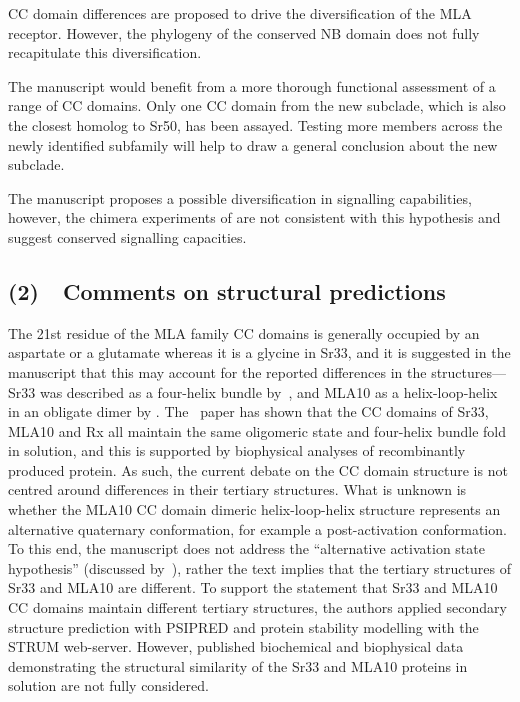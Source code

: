 \documentclass[10pt]{article}
\let\cite\citep
\providecommand\citep{\cite}
\begin{document}
\par\null

CC domain differences are proposed to drive the diversification of the
MLA receptor. However, the phylogeny of the conserved NB domain does not
fully recapitulate this diversification.

\par\null

The manuscript would benefit from a more thorough functional assessment
of a range of CC domains. Only one CC domain from the new subclade,
which is also the closest homolog to Sr50, has been assayed. Testing
more members across the newly identified subfamily will help to draw a
general conclusion about the new subclade.

\par\null

The manuscript proposes a possible diversification in signalling
capabilities, however, the chimera experiments of \cite{Jordan2011} are
not consistent with this hypothesis and suggest conserved signalling
capacities.

\par\null

\subsection*{(2)~~Comments on structural
predictions}

{\label{390222}}

The 21st residue of the MLA family CC domains is generally occupied by
an aspartate or a glutamate whereas it is a glycine in Sr33, and it is
suggested in the manuscript that this may account for the reported
differences in the structures---Sr33 was described as a four-helix
bundle by~\cite{Casey2016}, and MLA10 as a helix-loop-helix in an
obligate dimer by \cite{Maekawa2011}. The~\cite{Casey2016} paper has
shown that the CC domains of Sr33, MLA10 and Rx all maintain the same
oligomeric state and four-helix bundle fold in solution, and this is
supported by biophysical analyses of recombinantly produced protein. As
such, the current debate on the CC domain structure is not centred
around differences in their tertiary structures. What is unknown is
whether the MLA10 CC domain dimeric helix-loop-helix structure
represents an alternative quaternary conformation, for example a
post-activation conformation. To this end, the manuscript does not
address the ``alternative activation state hypothesis'' (discussed
by~\cite{27803318}), rather the text implies that the tertiary
structures of Sr33 and MLA10 are different. To support the statement
that Sr33 and MLA10 CC domains maintain different tertiary structures,
the authors applied secondary structure prediction with PSIPRED and
protein stability modelling with the STRUM web-server. However,
published biochemical and biophysical data demonstrating the structural
similarity of the Sr33 and MLA10 proteins in solution are not fully
considered.~
\end{document}

